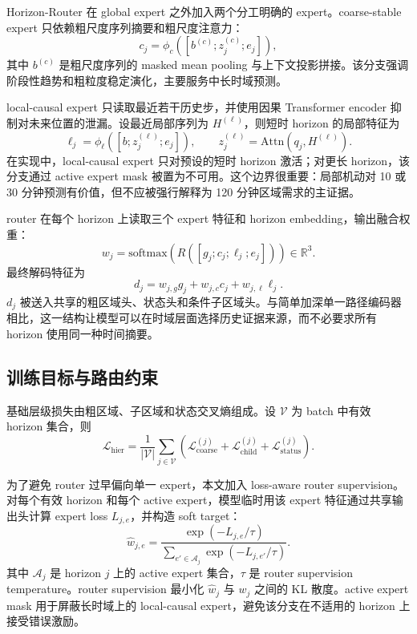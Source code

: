 Horizon-Router 在 global expert 之外加入两个分工明确的 expert。coarse-stable expert 只依赖粗尺度序列摘要和粗尺度注意力：
\begin{equation}
c_j=\phi_c([b^{(c)};z_j^{(c)};e_j]),
\end{equation}
其中 $b^{(c)}$ 是粗尺度序列的 masked mean pooling 与上下文投影拼接。该分支强调阶段性趋势和粗粒度稳定演化，主要服务中长时域预测。

local-causal expert 只读取最近若干历史步，并使用因果 Transformer encoder 抑制对未来位置的泄漏。设最近局部序列为 $H^{(\ell)}$，则短时 horizon 的局部特征为
\begin{equation}
\ell_j=\phi_\ell([b;z_j^{(\ell)};e_j]),\qquad
z_j^{(\ell)}=\mathrm{Attn}(q_j,H^{(\ell)}).
\end{equation}
在实现中，local-causal expert 只对预设的短时 horizon 激活；对更长 horizon，该分支通过 active expert mask 被置为不可用。这个边界很重要：局部机动对 10 或 30 分钟预测有价值，但不应被强行解释为 120 分钟区域需求的主证据。

router 在每个 horizon 上读取三个 expert 特征和 horizon embedding，输出融合权重：
\begin{equation}
w_j=\mathrm{softmax}(R([g_j;c_j;\ell_j;e_j]))\in\mathbb{R}^3.
\end{equation}
最终解码特征为
\begin{equation}
d_j=w_{j,g}g_j+w_{j,c}c_j+w_{j,\ell}\ell_j.
\end{equation}
$d_j$ 被送入共享的粗区域头、状态头和条件子区域头。与简单加深单一路径编码器相比，这一结构让模型可以在时域层面选择历史证据来源，而不必要求所有 horizon 使用同一种时间摘要。

\subsection{训练目标与路由约束}

基础层级损失由粗区域、子区域和状态交叉熵组成。设 $\mathcal{V}$ 为 batch 中有效 horizon 集合，则
\begin{equation}
\mathcal{L}_{\text{hier}}
=
\frac{1}{|\mathcal{V}|}
\sum_{j\in\mathcal{V}}
\left(
\mathcal{L}^{(j)}_{\text{coarse}}
+
\mathcal{L}^{(j)}_{\text{child}}
+
\mathcal{L}^{(j)}_{\text{status}}
\right).
\end{equation}

为了避免 router 过早偏向单一 expert，本文加入 loss-aware router supervision。对每个有效 horizon 和每个 active expert，模型临时用该 expert 特征通过共享输出头计算 expert loss $L_{j,e}$，并构造 soft target：
\begin{equation}
\hat{w}_{j,e}=
\frac{\exp(-L_{j,e}/\tau)}
{\sum_{e'\in\mathcal{A}_j}\exp(-L_{j,e'}/\tau)}.
\end{equation}
其中 $\mathcal{A}_j$ 是 horizon $j$ 上的 active expert 集合，$\tau$ 是 router supervision temperature。router supervision 最小化 $\hat{w}_j$ 与 $w_j$ 之间的 KL 散度。active expert mask 用于屏蔽长时域上的 local-causal expert，避免该分支在不适用的 horizon 上接受错误激励。

